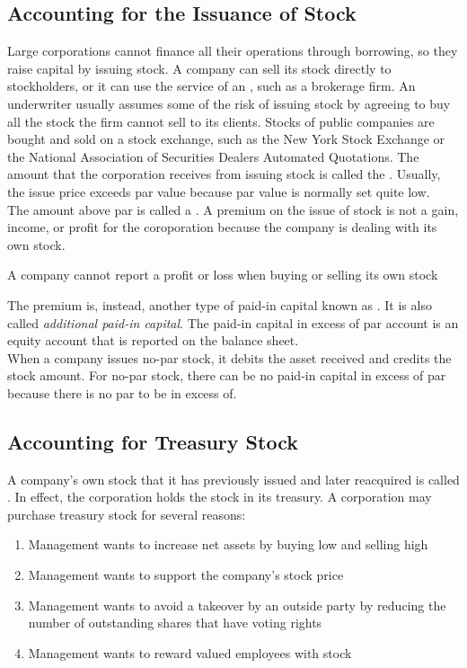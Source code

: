 \documentclass{article}
\begin{document}
\subsection{Accounting for the Issuance of Stock}

Large corporations cannot finance all their operations through borrowing, so they raise capital by issuing stock. A company can sell its stock directly to stockholders, or it can use the service of an , such as a brokerage firm. An underwriter usually assumes some of the risk of issuing stock by agreeing to buy all the stock the firm cannot sell to its clients. Stocks of public companies are bought and sold on a stock exchange, such as the New York Stock Exchange or the National Association of Securities Dealers Automated Quotations. The amount that the corporation receives from issuing stock is called the . Usually, the issue price exceeds par value because par value is normally set quite low. \\ 

The amount above par is called a . A premium on the issue of stock is not a gain, income, or profit for the coroporation because the company is dealing with its own stock. 
\begin{remark}
  A company cannot report a profit or loss when buying or selling its own stock
\end{remark}
The premium is, instead, another type of paid-in capital known as . It is also called \emph{additional paid-in capital}. The paid-in capital in excess of par account is an equity account that is reported on the balance sheet. \\ 

When a company issues no-par stock, it debits the asset received and credits the stock amount. For no-par stock, there can be no paid-in capital in excess of par because there is no par to be in excess of. \\ 

\subsection{Accounting for Treasury Stock}

A company's own stock that it has previously issued and later reacquired is called . In effect, the corporation holds the stock in its treasury. A corporation may purchase treasury stock for several reasons: 
\begin{enumerate}
  \item Management wants to increase net assets by buying low and selling high 
  \item Management wants to support the company's stock price 
  \item Management wants to avoid a takeover by an outside party by reducing the number of outstanding shares that have voting rights 
  \item Management wants to reward valued employees with stock
\end{enumerate}
\end{document}
